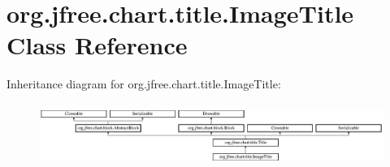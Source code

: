 \hypertarget{classorg_1_1jfree_1_1chart_1_1title_1_1_image_title}{}\section{org.\+jfree.\+chart.\+title.\+Image\+Title Class Reference}
\label{classorg_1_1jfree_1_1chart_1_1title_1_1_image_title}
Inheritance diagram for org.\+jfree.\+chart.\+title.\+Image\+Title\+:\begin{figure}[H]
\begin{center}
\leavevmode
\includegraphics[height=2.055046cm]{classorg_1_1jfree_1_1chart_1_1title_1_1_image_title}
\end{center}
\end{figure}
